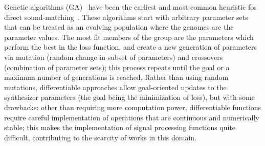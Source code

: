 Genetic algorithms (\gls{GA})~\cite{holland1992genetic} have been the earliest and most common heuristic for direct sound-matching~\cite{horner1993machine,mitchell2007evolutionary,yee2018automatic}. These algorithms start with arbitrary parameter sets that can be treated as an evolving population where the genomes are the parameter values. The most fit members of the group are the parameters which perform the best in the loss function, and create a new generation of parameters via mutation (random change in subset of parameters) and crossovers (combination of parameter sets); this process repeats until the goal or a maximum number of generations is reached. Rather than using random mutations, differentiable approaches allow goal-oriented updates to the synthesizer parameters (the goal being the minimization of loss), but with some drawbacks: other than requiring more computation power, differentiable functions require careful implementation of operations that are continuous and numerically stable; this makes the implementation of signal processing functions quite difficult, contributing to the scarcity of works in this domain.


